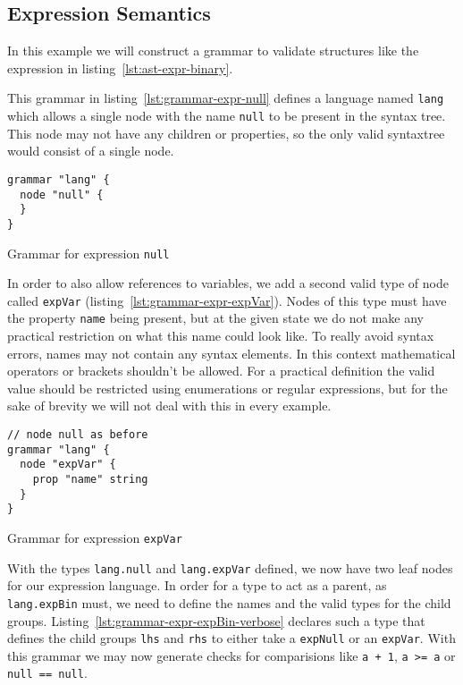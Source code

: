 \documentclass[sigconf,natbib=false,review=true,anonymous]{acmart}
\begin{document}
\subsection{Expression Semantics}

In this example we will construct a grammar to validate structures like the expression in listing~\ref{lst:ast-expr-binary}.

This grammar in listing~\ref{lst:grammar-expr-null} defines a language named \texttt{lang} which allows a single node with the name \texttt{null} to be present in the syntax tree. This node may not have any children or properties, so the only valid syntaxtree would consist of a single node.

\begin{listing}[H]
\begin{verbatim}
grammar "lang" {
  node "null" {
  }
}
\end{verbatim}
\caption{Grammar for expression \texttt{null}}
\label{lst:grammar-expr-null}
\end{listing}

In order to also allow references to variables, we add a second valid type of node called \texttt{expVar} (listing~\ref{lst:grammar-expr-expVar}). Nodes of this type must have the property \texttt{name} being present, but at the given state we do not make any practical restriction on what this name could look like. To really avoid syntax errors, names may not contain any syntax elements. In this context mathematical operators or brackets shouldn't be allowed. For a practical definition the valid value should be restricted using enumerations or regular expressions, but for the sake of brevity we will not deal with this in every example.

\begin{listing}[H]
\begin{verbatim}
// node null as before
grammar "lang" {
  node "expVar" {
    prop "name" string
  }
}
\end{verbatim}
\caption{Grammar for expression \texttt{expVar}}
\label{lst:grammar-expr-expVar}
\end{listing}

With the types \texttt{lang.null} and \texttt{lang.expVar} defined, we now have two leaf nodes for our expression language. In order for a type to act as a parent, as \texttt{lang.expBin} must, we need to define the names and the valid types for the child groups. Listing~\ref{lst:grammar-expr-expBin-verbose} declares such a type that defines the child groups \texttt{lhs} and \texttt{rhs} to either take a \texttt{expNull} or an \texttt{expVar}. With this grammar we may now generate checks for comparisions like \texttt{a + 1}, \texttt{a >= a} or \texttt{null == null}.
\end{document}
